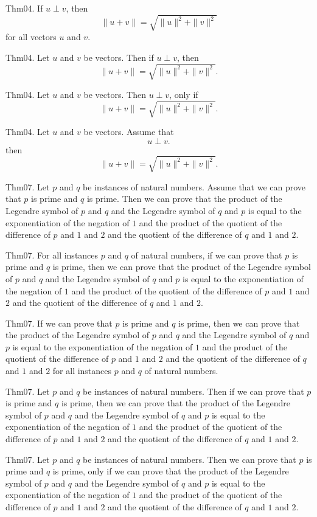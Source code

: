 \documentclass{article}
\begin{document}
Thm04. If $u \perp v$, then $$\| u + v \| = \sqrt{ \| u \| ^{ 2}+ \| v \| ^{ 2}}$$ for all vectors $u$ and $v$.

Thm04. Let $u$ and $v$ be vectors. Then if $u \perp v$, then $$\| u + v \| = \sqrt{ \| u \| ^{ 2}+ \| v \| ^{ 2}}.$$

Thm04. Let $u$ and $v$ be vectors. Then $u \perp v$, only if $$\| u + v \| = \sqrt{ \| u \| ^{ 2}+ \| v \| ^{ 2}}.$$

Thm04. Let $u$ and $v$ be vectors. Assume that $$u \perp v.$$ then $$\| u + v \| = \sqrt{ \| u \| ^{ 2}+ \| v \| ^{ 2}}.$$

Thm07. Let $p$ and $q$ be instances of natural numbers. Assume that we can prove that $p$ is prime and $q$ is prime. Then we can prove that the product of the Legendre symbol of $p$ and $q$ and the Legendre symbol of $q$ and $p$ is equal to the exponentiation of the negation of $1$ and the product of the quotient of the difference of $p$ and $1$ and $2$ and the quotient of the difference of $q$ and $1$ and $2$.

Thm07. For all instances $p$ and $q$ of natural numbers, if we can prove that $p$ is prime and $q$ is prime, then we can prove that the product of the Legendre symbol of $p$ and $q$ and the Legendre symbol of $q$ and $p$ is equal to the exponentiation of the negation of $1$ and the product of the quotient of the difference of $p$ and $1$ and $2$ and the quotient of the difference of $q$ and $1$ and $2$.

Thm07. If we can prove that $p$ is prime and $q$ is prime, then we can prove that the product of the Legendre symbol of $p$ and $q$ and the Legendre symbol of $q$ and $p$ is equal to the exponentiation of the negation of $1$ and the product of the quotient of the difference of $p$ and $1$ and $2$ and the quotient of the difference of $q$ and $1$ and $2$ for all instances $p$ and $q$ of natural numbers.

Thm07. Let $p$ and $q$ be instances of natural numbers. Then if we can prove that $p$ is prime and $q$ is prime, then we can prove that the product of the Legendre symbol of $p$ and $q$ and the Legendre symbol of $q$ and $p$ is equal to the exponentiation of the negation of $1$ and the product of the quotient of the difference of $p$ and $1$ and $2$ and the quotient of the difference of $q$ and $1$ and $2$.

Thm07. Let $p$ and $q$ be instances of natural numbers. Then we can prove that $p$ is prime and $q$ is prime, only if we can prove that the product of the Legendre symbol of $p$ and $q$ and the Legendre symbol of $q$ and $p$ is equal to the exponentiation of the negation of $1$ and the product of the quotient of the difference of $p$ and $1$ and $2$ and the quotient of the difference of $q$ and $1$ and $2$.
\end{document}
